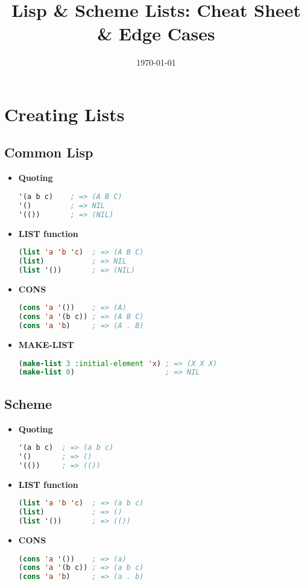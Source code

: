 \documentclass[10pt]{article}
\title{Lisp \& Scheme Lists: Cheat Sheet \& Edge Cases}
\author{ }
\date{\today}
\begin{document}
\maketitle

\section{Creating Lists}

\subsection*{Common Lisp}
\begin{itemize}
  \item \textbf{Quoting}
\begin{lstlisting}[language=Lisp]
'(a b c)    ; => (A B C)
'()         ; => NIL
'(())       ; => (NIL)
\end{lstlisting}
  \item \textbf{LIST function}
\begin{lstlisting}[language=Lisp]
(list 'a 'b 'c)  ; => (A B C)
(list)           ; => NIL
(list '())       ; => (NIL)
\end{lstlisting}
  \item \textbf{CONS}
\begin{lstlisting}[language=Lisp]
(cons 'a '())    ; => (A)
(cons 'a '(b c)) ; => (A B C)
(cons 'a 'b)     ; => (A . B)
\end{lstlisting}
  \item \textbf{MAKE-LIST}
\begin{lstlisting}[language=Lisp]
(make-list 3 :initial-element 'x) ; => (X X X)
(make-list 0)                     ; => NIL
\end{lstlisting}
\end{itemize}

\subsection*{Scheme}
\begin{itemize}
  \item \textbf{Quoting}
\begin{lstlisting}[language=Lisp]
'(a b c)  ; => (a b c)
'()       ; => ()
'(())     ; => (())
\end{lstlisting}
  \item \textbf{LIST function}
\begin{lstlisting}[language=Lisp]
(list 'a 'b 'c)  ; => (a b c)
(list)           ; => ()
(list '())       ; => (())
\end{lstlisting}
  \item \textbf{CONS}
\begin{lstlisting}[language=Lisp]
(cons 'a '())    ; => (a)
(cons 'a '(b c)) ; => (a b c)
(cons 'a 'b)     ; => (a . b)
\end{lstlisting}
\end{itemize}
\end{document}
